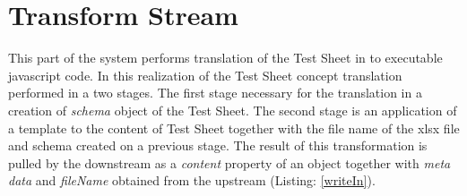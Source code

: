 %
%


\section{Transform Stream}
This part of the system performs translation of the Test Sheet in to executable javascript code. In this realization of the Test Sheet concept translation performed in a two stages. The first stage necessary for the translation in a creation of \textit{schema} object of the Test Sheet. The second stage is an application of a template to the content of Test Sheet together with the file name of the xlsx file and schema created on a previous stage. The result of this transformation is pulled by the downstream as a \textit{content} property of an object together with \textit{meta data} and \textit{fileName} obtained from the upstream (Listing: \ref{writeIn}).

